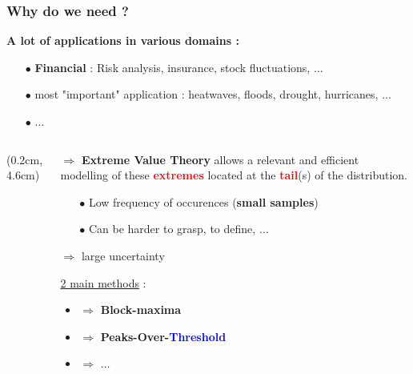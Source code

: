 \documentclass[9pt,xcolor={dvipsnames}]{beamer}
\begin{document}
\begin{frame}
\frametitle{ Why do we need  ?}
\begin{block}{\textbf{A lot of applications in \textbf{various domains :}}}
	\begin{itemize}
		\item[$\bullet$] \textbf{Financial} : Risk analysis, insurance, stock fluctuations, $\dots$
		\item[$\bullet$]  most "important" application  :
		heatwaves, floods, drought, hurricanes, $\dots$
		\item[$\bullet$] $\dots$
	\end{itemize}
\end{block}
\begin{columns}[t]
	\begin{column}[]{.4\textwidth}
		\begin{textblock*}{4cm}(0.2cm,4.6cm) %
		\end{textblock*}
	\end{column}
	\begin{column}{.7\textwidth}
		$\Rightarrow$ \textbf{Extreme Value Theory} allows a relevant and efficient modelling of these \textbf{\textcolor{red}{extremes}} located at the \textcolor{red}{\textbf{tail}}(s) of the distribution.
		\begin{itemize}
			\item[$\bullet$] Low frequency of occurences (\textbf{small samples}) 
			\item[$\bullet$] Can be harder to grasp, to define, $\dots$
		\end{itemize}
		   $\Rightarrow$ large uncertainty

	\begin{todolist}
		\item \underline{2 main methods} :
		\begin{itemize}
			\item  $\Rightarrow$ \textbf{Block-maxima}
			 \item$\Rightarrow$ \textbf{Peaks-Over-}\textcolor{blue}{\textbf{Threshold}}
			 \item$\Rightarrow$ $\dots$
		\end{itemize}
	\end{todolist}
	\end{column}
\end{columns}
\end{frame}
\end{document}
